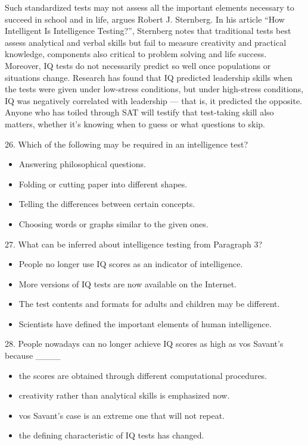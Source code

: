 \documentclass[UTF8,11pt]{ctexart}
\begin{document}
Such standardized tests may not assess all the important elements necessary to succeed in school and in life, argues Robert J. Sternberg. In his article “How Intelligent Is Intelligence Testing?”, Sternberg notes that traditional tests best assess analytical and verbal skills but fail to measure creativity and practical knowledge, components also critical to problem solving and life success. Moreover, IQ tests do not necessarily predict so well once populations or situations change. Research has found that IQ predicted leadership skills when the tests were given under low-stress conditions, but under high-stress conditions, IQ was negatively correlated with leadership — that is, it predicted the opposite. Anyone who has toiled through SAT will testify that test-taking skill also matters, whether it’s knowing when to guess or what questions to skip.


26. Which of the following may be required in an intelligence test?


\begin{itemize}[leftmargin=2em,itemsep=.2em,topsep=.4em]\item[A.] Answering philosophical questions.
\item[B.] Folding or cutting paper into different shapes.
\item[C.] Telling the differences between certain concepts.
\item[D.] Choosing words or graphs similar to the given ones.
\end{itemize}

27. What can be inferred about intelligence testing from Paragraph 3?


\begin{itemize}[leftmargin=2em,itemsep=.2em,topsep=.4em]\item[A.] People no longer use IQ scores as an indicator of intelligence.
\item[B.] More versions of IQ tests are now available on the Internet.
\item[C.] The test contents and formats for adults and children may be different.
\item[D.] Scientists have defined the important elements of human intelligence.
\end{itemize}

28. People nowadays can no longer achieve IQ scores as high as vos Savant’s because \_\_\_\_


\begin{itemize}[leftmargin=2em,itemsep=.2em,topsep=.4em]\item[A.] the scores are obtained through different computational procedures.
\item[B.] creativity rather than analytical skills is emphasized now.
\item[C.] vos Savant’s case is an extreme one that will not repeat.
\item[D.] the defining characteristic of IQ tests has changed.
\end{itemize}
\end{document}
